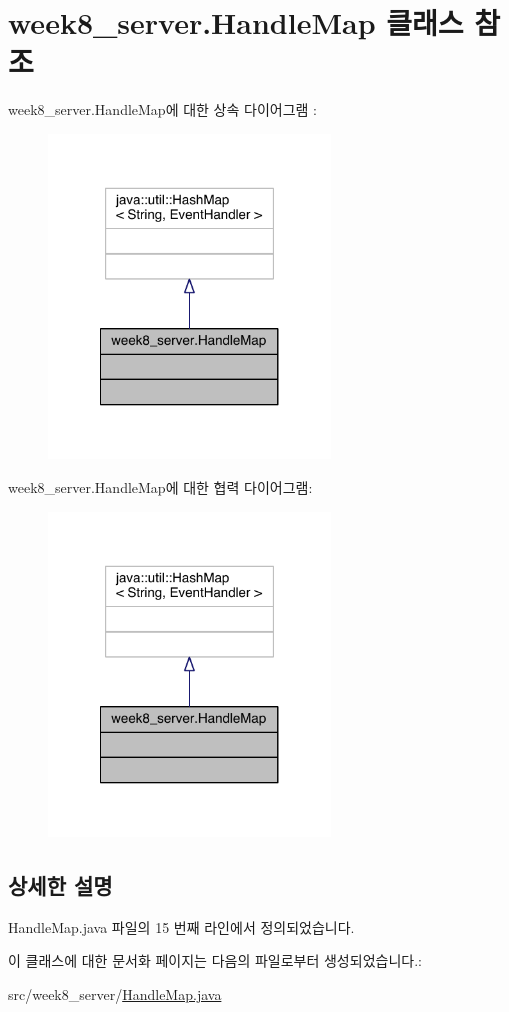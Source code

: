 \hypertarget{classweek8__server_1_1_handle_map}{\section{week8\-\_\-server.\-Handle\-Map 클래스 참조}
\label{classweek8__server_1_1_handle_map}
}


week8\-\_\-server.\-Handle\-Map에 대한 상속 다이어그램 \-: 
\nopagebreak
\begin{figure}[H]
\begin{center}
\leavevmode
\includegraphics[width=212pt]{classweek8__server_1_1_handle_map__inherit__graph}
\end{center}
\end{figure}


week8\-\_\-server.\-Handle\-Map에 대한 협력 다이어그램\-:
\nopagebreak
\begin{figure}[H]
\begin{center}
\leavevmode
\includegraphics[width=212pt]{classweek8__server_1_1_handle_map__coll__graph}
\end{center}
\end{figure}


\subsection{상세한 설명}


Handle\-Map.\-java 파일의 15 번째 라인에서 정의되었습니다.



이 클래스에 대한 문서화 페이지는 다음의 파일로부터 생성되었습니다.\-:\begin{DoxyCompactItemize}
\item 
src/week8\-\_\-server/\hyperlink{_handle_map_8java}{Handle\-Map.\-java}\end{DoxyCompactItemize}
